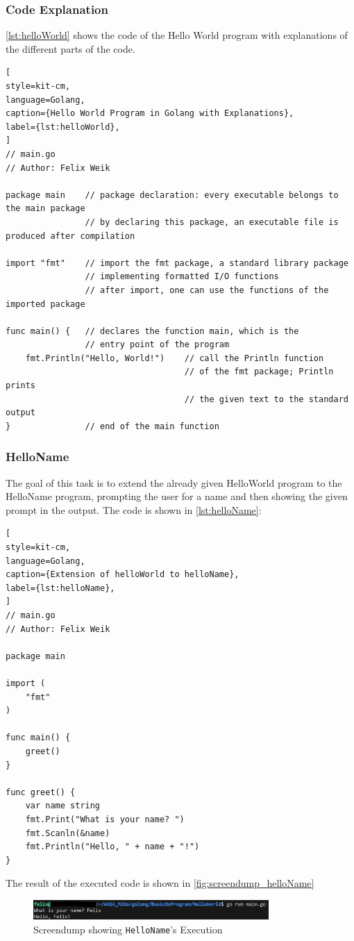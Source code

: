 \subsubsection*{Code Explanation}
\autoref{lst:helloWorld} shows the code of the Hello World program with explanations of the different parts of the code.
\begin{lstlisting}[
style=kit-cm,
language=Golang,
caption={Hello World Program in Golang with Explanations},
label={lst:helloWorld},
]
// main.go 
// Author: Felix Weik

package main    // package declaration: every executable belongs to the main package
                // by declaring this package, an executable file is produced after compilation

import "fmt"    // import the fmt package, a standard library package 
                // implementing formatted I/O functions
                // after import, one can use the functions of the imported package

func main() {   // declares the function main, which is the 
                // entry point of the program
    fmt.Println("Hello, World!")    // call the Println function 
                                    // of the fmt package; Println prints 
                                    // the given text to the standard output
}               // end of the main function

\end{lstlisting}

\subsubsection*{HelloName}
The goal of this task is to extend the already given HelloWorld program to the HelloName program, prompting the user for a name and then showing the given prompt in the output.
The code is shown in \autoref{lst:helloName}:
\begin{lstlisting}[
style=kit-cm,
language=Golang,
caption={Extension of helloWorld to helloName},
label={lst:helloName},
]
// main.go
// Author: Felix Weik

package main

import (
    "fmt"
)

func main() {
    greet()
}

func greet() {
    var name string
    fmt.Print("What is your name? ")
    fmt.Scanln(&name)
    fmt.Println("Hello, " + name + "!")
} 
\end{lstlisting}

The result of the executed code is shown in \autoref{fig:screendump_helloName}

\begin{figure}[H]
    \centering
    \includegraphics[width=0.8\textwidth]{figures/goLang/helloWorld/golang_helloWorld_helloName.png}
    \caption{Screendump showing \texttt{HelloName}'s Execution}
    \label{fig:screendump_helloName}
\end{figure}
